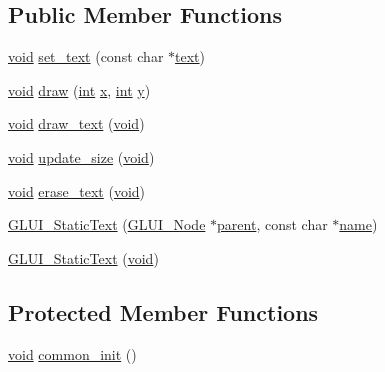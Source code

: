 \subsection*{Public Member Functions}
\begin{DoxyCompactItemize}
\item 
\hyperlink{wglext_8h_a9e6b7f1933461ef318bb000d6bd13b83}{void} \hyperlink{class_g_l_u_i___static_text_a2105e6f3f6061ccfaca8a24b2f984291}{set\+\_\+text} (const char $\ast$\hyperlink{class_g_l_u_i___control_af0d60e9736f4dbc34e9a536e75876d72}{text})
\item 
\hyperlink{wglext_8h_a9e6b7f1933461ef318bb000d6bd13b83}{void} \hyperlink{class_g_l_u_i___static_text_a2d92dfeb76e42682dbb69f26fc903194}{draw} (\hyperlink{wglext_8h_a500a82aecba06f4550f6849b8099ca21}{int} \hyperlink{glext_8h_ad77deca22f617d3f0e0eb786445689fc}{x}, \hyperlink{wglext_8h_a500a82aecba06f4550f6849b8099ca21}{int} \hyperlink{glext_8h_a9298c7ad619074f5285b32c6b72bfdea}{y})
\item 
\hyperlink{wglext_8h_a9e6b7f1933461ef318bb000d6bd13b83}{void} \hyperlink{class_g_l_u_i___static_text_ab29d8982750fe76f607b18bcc00febdf}{draw\+\_\+text} (\hyperlink{wglext_8h_a9e6b7f1933461ef318bb000d6bd13b83}{void})
\item 
\hyperlink{wglext_8h_a9e6b7f1933461ef318bb000d6bd13b83}{void} \hyperlink{class_g_l_u_i___static_text_ab244674e811501594eca5ea312a30bdd}{update\+\_\+size} (\hyperlink{wglext_8h_a9e6b7f1933461ef318bb000d6bd13b83}{void})
\item 
\hyperlink{wglext_8h_a9e6b7f1933461ef318bb000d6bd13b83}{void} \hyperlink{class_g_l_u_i___static_text_ae7d5da0264d0b04a46bfb8c27e441b58}{erase\+\_\+text} (\hyperlink{wglext_8h_a9e6b7f1933461ef318bb000d6bd13b83}{void})
\item 
\hyperlink{class_g_l_u_i___static_text_a47e7c2daa86db06eed1dea62b0ac091c}{G\+L\+U\+I\+\_\+\+Static\+Text} (\hyperlink{class_g_l_u_i___node}{G\+L\+U\+I\+\_\+\+Node} $\ast$\hyperlink{class_g_l_u_i___node_a8ed65d447784f6f88bd3e2e2bcac6cdb}{parent}, const char $\ast$\hyperlink{glext_8h_ad977737dfc9a274a62741b9500c49a32}{name})
\item 
\hyperlink{class_g_l_u_i___static_text_afd447327f6bbadfad05f40614b1f4860}{G\+L\+U\+I\+\_\+\+Static\+Text} (\hyperlink{wglext_8h_a9e6b7f1933461ef318bb000d6bd13b83}{void})
\end{DoxyCompactItemize}
\subsection*{Protected Member Functions}
\begin{DoxyCompactItemize}
\item 
\hyperlink{wglext_8h_a9e6b7f1933461ef318bb000d6bd13b83}{void} \hyperlink{class_g_l_u_i___static_text_a16eba99849bcd604173f170bc01050d7}{common\+\_\+init} ()
\end{DoxyCompactItemize}
